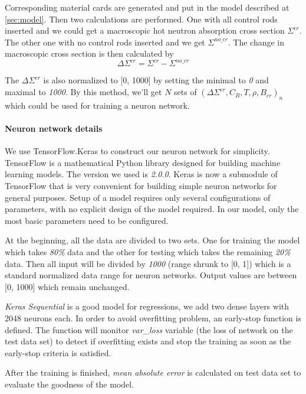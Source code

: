 Corresponding material cards are generated and put in the model described at \ref{sec:model}.
Then two calculations are performed.
One with all control rods inserted and we could get a macroscopic hot neutron absorption cross section $\Sigma^{cr}$.
The other one with no control rods inserted and we get $\Sigma^{no\_cr}$.
The change in macroscopic cross section is then calculated by
\begin{equation}
    \label{eq:dSigma}
    \Delta \Sigma^{cr} = \Sigma^{cr} - \Sigma^{no\_cr}
\end{equation}

The $\Delta \Sigma^{cr}$ is also normalized to [0, 1000]
by setting the minimal to \textit{0} and maximal to \textit{1000}.
By this method, we'll get $N$ sets of $(\Delta \Sigma^{cr}, C_B, T, \rho, B_{cr})_n$ which
could be used for training a neuron network.



\paragraph{Neuron network details}
\label{sec::dnn_para}

We use TensorFlow.Keras to construct our neuron network for simplicity.
TensorFlow is a mathematical Python library designed for building machine learning models.
The version we used is \textit{2.0.0}.
Keras is now a submodule of TensorFlow that is very convenient for building simple neuron networks
for general purposes.
Setup of a model requires only several configurations of parameters,
with no explicit design of the model required.
In our model, only the most basic parameters need to be configured.

At the beginning, all the data are divided to two sets.
One for training the model which takes \textit{80\%} data and
the other for testing which takes the remaining \textit{20\%} data.
Then all input will be divided by \textit{1000} (range shrunk to [0, 1]) which is a
standard normalized data range for neuron networks.
Output values are between [0, 1000] which remain unchanged.

\textit{Keras Sequential} is a good model for regressions, we add two dense layers with 2048 neurons each.
In order to avoid overfitting problem, an early-stop function is defined.
The function will monitor \textit{var\_loss} variable (the loss of network on the test data set) to
detect if overfitting exists and stop the training as soon as the early-stop criteria is satisfied.


After the training is finished, \textit{mean absolute error} is calculated on test data set to evaluate the
goodness of the model.


